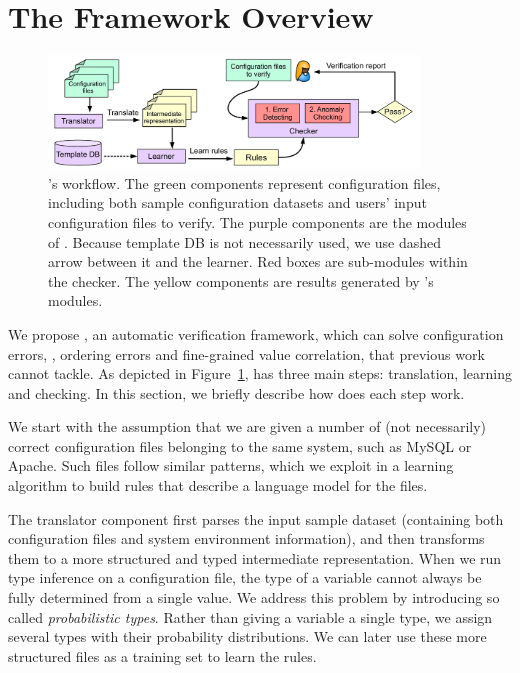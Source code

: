 
\section{The \app Framework Overview}

\begin{figure}[tbp] \centering
\includegraphics[width=0.88\textwidth]{figs/overview}
\caption{\app's workflow. The green components represent configuration 
  files, including both sample configuration datasets and users' input
  configuration files to verify. 
  The purple components are the modules of \app.
  Because template DB is not necessarily used, we use dashed
  arrow between it and the learner.
  Red boxes are sub-modules within the checker.
  The yellow components are results generated by \app's modules.}
\label{fig-overview}
\end{figure}

We propose \app, an automatic verification framework,
which can solve configuration errors, \eg, ordering errors
and fine-grained value correlation, that previous work cannot tackle.
As depicted in Figure~\ref{fig-overview}, \app has three main steps:
translation, learning and checking. In this section, we briefly
describe how does each step work.

We start
with the assumption that we are given a number of (not necessarily) 
correct configuration files belonging to the same system, 
such as MySQL or Apache. 
Such files follow similar patterns, which we exploit
in a learning algorithm to build rules that
describe a language model for the files.

The translator component first parses the input sample 
dataset (containing both configuration files and system environment
information), and then transforms them to a more structured
and typed intermediate representation.
When we run type inference on a configuration file, 
the type of a variable cannot always be fully determined from 
a single value.
We address this problem 
by introducing so called {\em probabilistic types}.
Rather than giving a variable a single type, 
we assign several types with their probability distributions. 
We can later use these more structured files
as a training set to learn the rules. 

